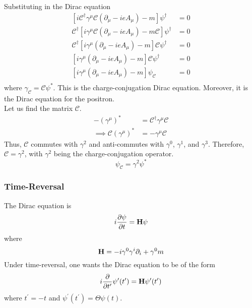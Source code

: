 \documentclass[12pt,a4paper,titlepage]{article}
\begin{document}
Substituting in the Dirac equation
\begin{equation}
\begin{aligned}
[i\mathcal{C}^{\dagger}\gamma^{\mu}\mathcal{C}(\partial_{\mu}-ieA_{\mu})-m]\psi^{\dagger}&=0\\
\mathcal{C}^{\dagger}[i\gamma^{\mu}\mathcal{C}(\partial_{\mu}-ieA_{\mu})-m\mathcal{C}]\psi^{\dagger}&=0\\
\mathcal{C}^{\dagger}[i\gamma^{\mu}(\partial_{\mu}-ieA_{\mu})-m]\mathcal{C}\psi^{\dagger}&=0\\
[i\gamma^{\mu}(\partial_{\mu}-ieA_{\mu})-m]\mathcal{C}\psi^{\dagger}&=0\\
[i\gamma^{\mu}(\partial_{\mu}-ieA_{\mu})-m]\psi_{\mathcal{C}}&=0\\
\end{aligned}
\end{equation}
where $\gamma_{\mathcal{C}}=\mathcal{C}\psi^{*}$. This is the charge-conjugation Dirac equation. Moreover, it is the Dirac equation for the positron.\\

Let us find the matrix $\mathcal{C}$.
\begin{equation}
\begin{aligned}
-(\gamma^{\mu})^{*}&=\mathcal{C}^{\dagger}\gamma^{\mu}\mathcal{C}\\
\implies \mathcal{C}(\gamma^{\mu})^{*}&=-\gamma^{\mu}\mathcal{C}
\end{aligned}
\end{equation}
Thus, $\mathcal{C}$ commutes with $\gamma^{2}$ and anti-commutes with $\gamma^{0}$, $\gamma^{1}$, and $\gamma^{3}$. Therefore, $\mathcal{C}=\gamma^{2}$, with $\gamma^{2}$ being the charge-conjugation operator.
\begin{equation}
\psi_{\mathcal{C}}=\gamma^{2}\psi^{*}
\end{equation}

\subsubsection{Time-Reversal}
The Dirac equation is
\begin{equation}
i\pdv{\psi}{t}=\vb{H}\psi
\end{equation}
where 
\begin{equation}
\vb{H}=-i\gamma^{0}\gamma^{i}\partial_{i}+\gamma^{0}m
\end{equation}
Under time-reversal, one wants the Dirac equation to be of the form
\begin{equation}
i\pdv{t^{\prime}}\psi^{\prime}(t^{\prime})=\vb{H}\psi^{\prime}(t^{\prime})
\end{equation}
where $t^{\prime}=-t$ and $\psi^{\prime}(t^{\prime})=\Theta\psi(t)$.\\
\end{document}
